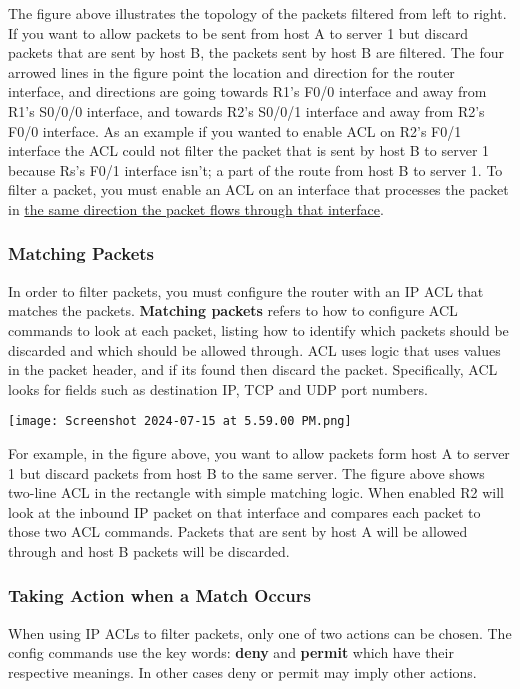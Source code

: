 \documentclass[a4paper]{article}
\begin{document}
    The figure above illustrates the topology of the packets filtered from left to right. If you want to allow packets to be sent from host A to server 1 but discard packets that are sent by host B, the packets sent by host B are filtered. The four arrowed lines in the figure point the location and direction for the router interface, and directions are going towards R1's F0/0 interface and away from R1's S0/0/0 interface, and towards R2's S0/0/1 interface and away from R2's F0/0 interface. As an example if you wanted to enable ACL on R2's F0/1 interface the ACL could not filter the packet that is sent by host B to server 1 because Rs's F0/1 interface isn't; a part of the route from host B to server 1. To filter a packet, you must enable an ACL on an interface that processes the packet in \underline{the same direction the packet flows through that interface}. 

    \subsubsection{Matching Packets}
    In order to filter packets, you must configure the router with an IP ACL that matches the packets. \textbf{Matching packets} refers to how to configure ACL commands to look at each packet, listing how to identify which packets should be discarded and which should be allowed through. ACL uses logic that uses values in the packet header, and if its found then discard the packet. Specifically, ACL looks for fields such as destination IP, TCP and UDP port numbers. 
    
    \texttt{[image: Screenshot 2024-07-15 at 5.59.00 PM.png]}

    For example, in the figure above, you want to allow packets form host A to server 1 but discard packets from host B to the same server. The figure above shows two-line ACL in the rectangle with simple matching logic. When enabled R2 will look at the inbound IP packet on that interface and compares each packet to those two ACL commands. Packets that are sent by host A will be allowed through and host B packets will be discarded.

    \subsubsection{Taking Action when a Match Occurs}
    When using IP ACLs to filter packets, only one of two actions can be chosen. The config commands use the key words: \textbf{deny} and \textbf{permit} which have their respective meanings. In other cases deny or permit may imply other actions.
\end{document}
